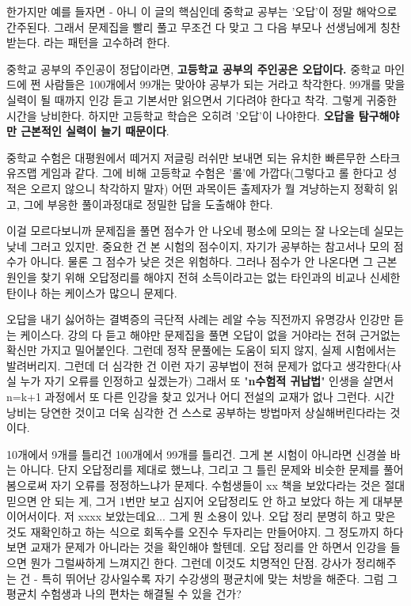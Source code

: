 한가지만 예를 들자면 - 아니 이 글의 핵심인데
중학교 공부는 '오답'이 정말 해악으로 간주된다.
그래서 문제집을 빨리 풀고 무조건 다 맞고 그 다음 부모나 선생님에게 칭찬받는다.
라는 패턴을 고수하려 한다.
\vspace{5mm}

중학교 공부의 주인공이 정답이라면, \textbf{고등학교 공부의 주인공은 오답이다.}
중학교 마인드에 쩐 사람들은 100개에서 99개는 맞아야 공부가 되는 거라고 착각한다.
99개를 맞을 실력이 될 때까지 인강 듣고 기본서만 읽으면서 기다려야 한다고 착각. 그렇게 귀중한 시간을 낭비한다.
하지만 고등학교 학습은 오히려 '오답'이 나야한다.
\textbf{오답을 탐구해야만 근본적인 실력이 늘기 때문이다}.
\vspace{5mm}

중학교 수험은 대평원에서 떼거지 저글링 러쉬만 보내면 되는 유치한 빠른무한 스타크 유즈맵 게임과 같다.
그에 비해 고등학교 수험은 '롤'에 가깝다(그렇다고 롤 한다고 성적은 오르지 않으니 착각하지 말자)
어떤 과목이든 출제자가 뭘 겨냥하는지 정확히 읽고, 그에 부응한 풀이과정대로 정밀한 답을 도출해야 한다.
\vspace{5mm}

이걸 모르다보니까 문제집을 풀면 점수가 안 나오네 평소에 모의는 잘 나오는데 실모는 낮네 그러고 있지만.
중요한 건 본 시험의 점수이지, 자기가 공부하는 참고서나 모의 점수가 아니다.
물론 그 점수가 낮은 것은 위험하다. 그러나 점수가 안 나온다면 그 근본원인을 찾기 위해 오답정리를 해야지
전혀 소득이라고는 없는 타인과의 비교나 신세한탄이나 하는 케이스가 많으니 문제다.
\vspace{5mm}

오답을 내기 싫어하는 결벽증의 극단적 사례는 레알 수능 직전까지 유명강사 인강만 듣는 케이스다.
강의 다 듣고 해야만 문제집을 풀면 오답이 없을 거야라는 전혀 근거없는 확신만 가지고 밀어붙인다.
그런데 정작 문풀에는 도움이 되지 않지, 실제 시험에서는 발려버리지.
그런데 더 심각한 건 이런 자기 공부법이 전혀 문제가 없다고 생각한다(사실 누가 자기 오류를 인정하고 싶겠는가)
그래서 또 "\textbf{n수험적 귀납법}" 인생을 살면서 n=k+1 과정에서 또 다른 인강을 찾고 있거나 어디 전설의 교재가 없나 그런다.
시간 낭비는 당연한 것이고 더욱 심각한 건 스스로 공부하는 방법마저 상실해버린다라는 것이다.
\vspace{5mm}

10개에서 9개를 틀리건 100개에서 99개를 틀리건. 그게 본 시험이 아니라면 신경쓸 바는 아니다.
단지 오답정리를 제대로 했느냐, 그리고 그 틀린 문제와 비슷한 문제를 풀어봄으로써 자기 오류를 정정하느냐가 문제다.
수험생들이 xx 책을 보았다라는 것은 절대 믿으면 안 되는 게, 그거 1번만 보고 심지어 오답정리도 안 하고 보았다 하는 게 대부분이어서이다.
저 xxxx 보았는데요... 그게 뭔 소용이 있나. 오답 정리 분명히 하고 맞은 것도 재확인하고 하는 식으로 회독수를 오진수 두자리는 만들어야지.
그 정도까지 하다보면 교재가 문제가 아니라는 것을 확인해야 할텐데.
오답 정리를 안 하면서 인강을 들으면 뭔가 그럴싸하게 느껴지긴 한다. 그런데 이것도 치명적인 단점.
강사가 정리해주는 건 - 특히 뛰어난 강사일수록 자기 수강생의 평균치에 맞는 처방을 해준다.
그럼 그 평균치 수험생과 나의 편차는 해결될 수 있을 건가?
\vspace{5mm}

